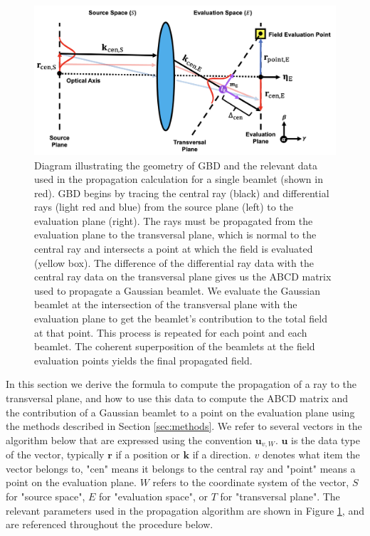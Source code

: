 \begin{figure}[H]
    \centering
    \includegraphics[width=\textwidth]{gbd_prop_diagram.png}
    \caption{Diagram illustrating the geometry of GBD and the relevant data used in the propagation calculation for a single beamlet (shown in red). GBD begins by tracing the central ray (black) and differential rays (light red and blue) from the source plane (left) to the evaluation plane (right). The rays must be propagated from the evaluation plane to the transversal plane, which is normal to the central ray and intersects a point at which the field is evaluated (yellow box). The difference of the differential ray data with the central ray data on the transversal plane gives us the ABCD matrix used to propagate a Gaussian beamlet. We evaluate the Gaussian beamlet at the intersection of the transversal plane with the evaluation plane to get the beamlet's contribution to the total field at that point. This process is repeated for each point and each beamlet. The coherent superposition of the beamlets at the field evaluation points yields the final propagated field.}
    \label{fig:gaussian_prop_diagram}
\end{figure}

In this section we derive the formula to compute the propagation of a ray to the transversal plane, and how to use this data to compute the ABCD matrix and the contribution of a Gaussian beamlet to a point on the evaluation plane using the methods described in Section \ref{sec:methods}. We refer to several vectors in the algorithm below that are expressed using the convention $\mathbf{u}_{v,W}$. $\mathbf{u}$ is the data type of the vector, typically $\mathbf{r}$ if a position or $\mathbf{k}$ if a direction. $v$ denotes what item the vector belongs to, "cen" means it belongs to the central ray and "point" means a point on the evaluation plane. $W$ refers to the coordinate system of the vector, $S$ for "source space", $E$ for "evaluation space", or $T$ for "transversal plane". The relevant parameters used in the propagation algorithm are shown in Figure \ref{fig:gaussian_prop_diagram}, and are referenced throughout the procedure below.

